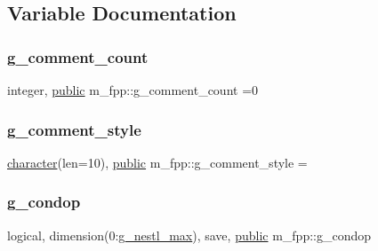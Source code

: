 \subsection{Variable Documentation}
\mbox{\label{namespacem__fpp_a3cbfb5247b11d5ebe1563b7cd1564c14}} 
\subsubsection{\texorpdfstring{g\+\_\+comment\+\_\+count}{g\_comment\_count}}
{\footnotesize\ttfamily integer, \hyperlink{M__stopwatch_83_8txt_a2f74811300c361e53b430611a7d1769f}{public} m\+\_\+fpp\+::g\+\_\+comment\+\_\+count =0}

\mbox{\label{namespacem__fpp_affffb83550152a13f0592ef4b30496b8}} 
\subsubsection{\texorpdfstring{g\+\_\+comment\+\_\+style}{g\_comment\_style}}
{\footnotesize\ttfamily \hyperlink{option__stopwatch_83_8txt_abd4b21fbbd175834027b5224bfe97e66}{character}(len=10), \hyperlink{M__stopwatch_83_8txt_a2f74811300c361e53b430611a7d1769f}{public} m\+\_\+fpp\+::g\+\_\+comment\+\_\+style =\textquotesingle{} \textquotesingle{}}

\mbox{\label{namespacem__fpp_a380f6ad747fc050f112465e63a371e82}} 
\subsubsection{\texorpdfstring{g\+\_\+condop}{g\_condop}}
{\footnotesize\ttfamily logical, dimension(0\+:\hyperlink{namespacem__fpp_a8d8e200282a7bfd05dfd73337a7bf4e0}{g\+\_\+nestl\+\_\+max}), save, \hyperlink{M__stopwatch_83_8txt_a2f74811300c361e53b430611a7d1769f}{public} m\+\_\+fpp\+::g\+\_\+condop}

\mbox{\label{namespacem__fpp_a546a9c9d569439024e367632ee6db908}} 
